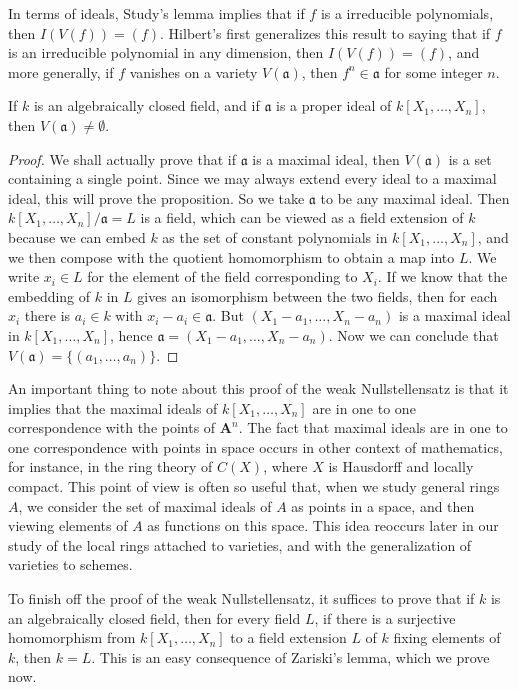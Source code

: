 In terms of ideals, Study's lemma implies that if $f$ is a irreducible polynomials, then $I(V(f)) = (f)$. Hilbert's first generalizes this result to saying that if $f$ is an irreducible polynomial in any dimension, then $I(V(f)) = (f)$, and more generally, if $f$ vanishes on a variety $V(\mathfrak{a})$, then $f^n \in \mathfrak{a}$ for some integer $n$.

\begin{lemma}
    If $k$ is an algebraically closed field, and if $\mathfrak{a}$ is a proper ideal of $k[X_1, \dots, X_n]$, then $V(\mathfrak{a}) \neq \emptyset$.
\end{lemma}
\begin{proof}
    We shall actually prove that if $\mathfrak{a}$ is a maximal ideal, then $V(\mathfrak{a})$ is a set containing a single point. Since we may always extend every ideal to a maximal ideal, this will prove the proposition. So we take $\mathfrak{a}$ to be any maximal ideal. Then $k[X_1, \dots, X_n]/\mathfrak{a} = L$ is a field, which can be viewed as a field extension of $k$ because we can embed $k$ as the set of constant polynomials in $k[X_1, \dots, X_n]$, and we then compose with the quotient homomorphism to obtain a map into $L$. We write $x_i \in L$ for the element of the field corresponding to $X_i$. If we know that the embedding of $k$ in $L$ gives an isomorphism between the two fields, then for each $x_i$ there is $a_i \in k$ with $x_i - a_i \in \mathfrak{a}$. But $(X_1 - a_1, \dots, X_n - a_n)$ is a maximal ideal in $k[X_1, \dots, X_n]$, hence $\mathfrak{a} = (X_1 - a_1, \dots, X_n - a_n)$. Now we can conclude that $V(\mathfrak{a}) = \{ (a_1, \dots, a_n) \}$.
\end{proof}

An important thing to note about this proof of the weak Nullstellensatz is that it implies that the maximal ideals of $k[X_1, \dots, X_n]$ are in one to one correspondence with the points of $\mathbf{A}^n$. The fact that maximal ideals are in one to one correspondence with points in space occurs in other context of mathematics, for instance, in the ring theory of $C(X)$, where $X$ is Hausdorff and locally compact. This point of view is often so useful that, when we study general rings $A$, we consider the set of maximal ideals of $A$ as points in a space, and then viewing elements of $A$ as functions on this space. This idea reoccurs later in our study of the local rings attached to varieties, and with the generalization of varieties to schemes.

To finish off the proof of the weak Nullstellensatz, it suffices to prove that if $k$ is an algebraically closed field, then for every field $L$, if there is a surjective homomorphism from $k[X_1, \dots, X_n]$ to a field extension $L$ of $k$ fixing elements of $k$, then $k = L$. This is an easy consequence of Zariski's lemma, which we prove now.


